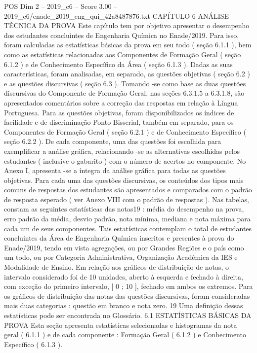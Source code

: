 \begin{textsample}{POS Dim 2 – 2019\_c6 – Score 3.00 – 2019\_c6/enade\_2019\_eng\_qui\_42a8487876.txt}  \label{ex:f2_pos_155}
CAPÍTULO 6 ANÁLISE TÉCNICA DA PROVA Este capítulo tem por objetivo apresentar o desempenho dos estudantes concluintes de Engenharia Química no Enade/2019.
Para isso, foram calculadas as estatísticas básicas da prova em seu todo ( seção 6.1.1 ), bem como as estatísticas relacionadas aos Componentes de Formação Geral ( seção 6.1.2 ) e de Conhecimento Específico da Área ( seção 6.1.3 ).
Dadas as suas características, foram analisadas, em separado, as questões objetivas ( seção 6.2 ) e as questões discursivas ( seção 6.3 ).
Tomando -se como base as duas questões discursivas do Componente de Formação Geral, nas seções 6.3.1.5 a 6.3.1.8, são apresentados comentários sobre a correção das respostas em relação à Língua Portuguesa.
Para as questões objetivas, foram disponibilizados os índices de facilidade e de discriminação Ponto-Bisserial, também em separado, para os Componentes de Formação Geral ( seção 6.2.1 ) e de Conhecimento Específico ( seção 6.2.2 ).
De cada componente, uma das questões foi escolhida para exemplificar a análise gráfica, relacionando -se as alternativas escolhidas pelos estudantes ( inclusive o gabarito ) com o número de acertos no componente.
No Anexo I, apresenta -se a íntegra da análise gráfica para todas as questões objetivas.
Para cada uma das questões discursivas, os conteúdos dos tipos mais comuns de respostas dos estudantes são apresentados e comparados com o padrão de resposta esperado ( ver Anexo VIII com o padrão de respostas ).
Nas tabelas, constam as seguintes estatísticas das notas19 : média do desempenho na prova, erro padrão da média, desvio padrão, nota mínima, mediana e nota máxima para cada um de seus componentes.
Tais estatísticas contemplam o total de estudantes concluintes da Área de Engenharia Química inscritos e presentes à prova do Enade/2019, tendo em vista agregações, ou por Grandes Regiões e o país como um todo, ou por Categoria Administrativa, Organização Acadêmica da IES e Modalidade de Ensino.
Em relação aos gráficos de distribuição de notas, o intervalo considerado foi de 10 unidades, aberto à esquerda e fechado à direita, com exceção do primeiro intervalo, [ 0 ; 10 ], fechado em ambos os extremos.
Para os gráficos de distribuição das notas das questões discursivas, foram consideradas mais duas categorias : questão em branco e nota zero. 19 Uma definição dessas estatísticas pode ser encontrada no Glossário. 6.1 ESTATÍSTICAS BÁSICAS DA PROVA Esta seção apresenta estatísticas selecionadas e histogramas da nota geral ( 6.1.1 ) e de cada componente : Formação Geral ( 6.1.2 ) e Conhecimento Específico ( 6.1.3 ).

\end{textsample}
